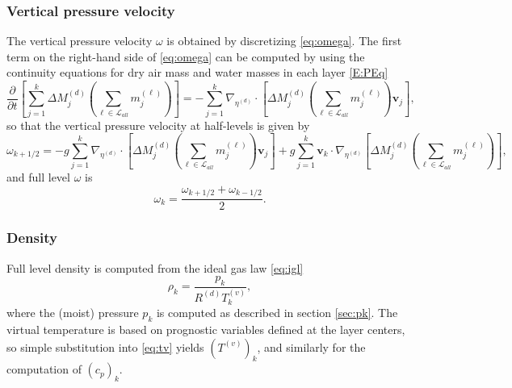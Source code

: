 \documentclass{agujournal}
\begin{document}
{\subsubsection{Vertical pressure velocity}
The vertical pressure velocity $\omega$ is obtained by discretizing \eqref{eq:omega}. The first term on the right-hand side of \eqref{eq:omega} can be computed by using the continuity equations for dry air mass and water masses in each layer \eqref{E:PEq}
\begin{equation}
\frac{\partial }{\partial t}\left[\sum_{j=1}^k \Delta M^{(d)}_j \left( \sum_{\ell \in \mathcal{L}_{all}} m_j^{(\ell)}\right)\right] = -\sum_{j=1}^k \nabla_{\eta^{(d)}}\cdot \left[ \Delta M^{(d)}_j\left(\sum_{\ell \in \mathcal{L}_{all}} m_j^{(\ell)} \right)\mathbf{v}_j\right],
\end{equation}
so that the vertical pressure velocity at half-levels is given by
\begin{equation}
\omega_{k+1/2}=-g\sum_{j=1}^k \nabla_{\eta^{(d)}}\cdot \left[ \Delta M^{(d)}_j\left(\sum_{\ell \in \mathcal{L}_{all}} m_j^{(\ell)} \right)\mathbf{v}_j \right]+g\sum_{j=1}^k \mathbf{v}_k \cdot \nabla_{\eta^{(d)}}\left[ \Delta M^{(d)}_j\left( \sum_{\ell \in \mathcal{L}_{all}} m_j^{(\ell)}\right)\right],
\end{equation}
and full level $\omega$ is
\begin{equation}
\omega_k=\frac{\omega_{k+1/2}+\omega_{k-1/2}}{2}.
\end{equation}
\subsubsection{Density}
Full level density is computed from the ideal gas law \eqref{eq:igl}
\begin{equation}
\rho_k=\frac{p_k}{R^{(d)} T_k^{(v)}},
\end{equation}
where the (moist) pressure $p_k$ is computed as described in section \ref{sec:pk}. The virtual temperature is based on prognostic variables defined at the layer centers, so simple substitution into \eqref{eq:tv} yields $\left(T^{(v)}\right)_k$, and similarly for the computation of $\left( c_p\right)_k$.
}
\end{document}
